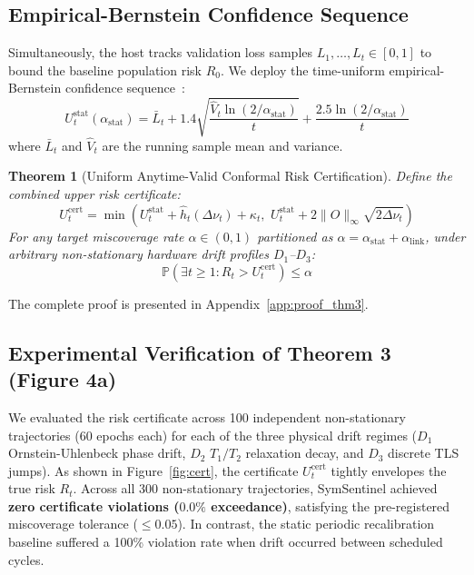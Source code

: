 \documentclass[aps,pra,twocolumn,superscriptaddress,10pt,floatfix]{revtex4-2}
\newtheorem{theorem}{Theorem}
\begin{document}
\subsection{Empirical-Bernstein Confidence Sequence}
Simultaneously, the host tracks validation loss samples $L_1, \dots, L_t \in [0, 1]$ to bound the baseline population risk $R_0$. We deploy the time-uniform empirical-Bernstein confidence sequence~\cite{howard2021time,waudby2024estimating}:
\begin{equation}
U_t^{\mathrm{stat}}(\alpha_{\mathrm{stat}}) = \bar{L}_t + 1.4 \sqrt{\frac{\hat{V}_t \ln(2/\alpha_{\mathrm{stat}})}{t}} + \frac{2.5 \ln(2/\alpha_{\mathrm{stat}})}{t}
\label{eq:emp_bernstein}
\end{equation}
where $\bar{L}_t$ and $\hat{V}_t$ are the running sample mean and variance.

\begin{theorem}[Uniform Anytime-Valid Conformal Risk Certification]
\label{thm:certify}
Define the combined upper risk certificate:
\begin{equation}
U_t^{\mathrm{cert}} = \min\left( U_t^{\mathrm{stat}} + \hat{h}_t(\Delta \nu_t) + \kappa_t, \,\, U_t^{\mathrm{stat}} + 2 \|O\|_\infty \sqrt{2 \Delta \nu_t} \right)
\label{eq:combined_cert}
\end{equation}
For any target miscoverage rate $\alpha \in (0, 1)$ partitioned as $\alpha = \alpha_{\mathrm{stat}} + \alpha_{\mathrm{link}}$, under arbitrary non-stationary hardware drift profiles $D_1$--$D_3$:
\begin{equation}
\mathbb{P}\left( \exists t \ge 1 : R_t > U_t^{\mathrm{cert}} \right) \le \alpha
\end{equation}
\end{theorem}
The complete proof is presented in Appendix~\ref{app:proof_thm3}.

\subsection{Experimental Verification of Theorem 3 (Figure 4a)}
We evaluated the risk certificate across 100 independent non-stationary trajectories (60 epochs each) for each of the three physical drift regimes ($D_1$ Ornstein-Uhlenbeck phase drift, $D_2$ $T_1/T_2$ relaxation decay, and $D_3$ discrete TLS jumps). As shown in Figure~\ref{fig:cert}, the certificate $U_t^{\mathrm{cert}}$ tightly envelopes the true risk $R_t$. Across all 300 non-stationary trajectories, SymSentinel achieved \textbf{zero certificate violations ($0.0\%$ exceedance)}, satisfying the pre-registered miscoverage tolerance ($\le 0.05$). In contrast, the static periodic recalibration baseline suffered a 100\% violation rate when drift occurred between scheduled cycles.
\end{document}
